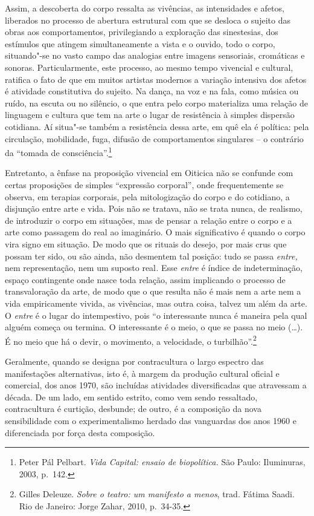 Assim, a descoberta do corpo ressalta as vivências, as intensidades e
afetos, liberados no processo de abertura estrutural com que se desloca
o sujeito das obras aos comportamentos, privilegiando a exploração das
sinestesias, dos estímulos que atingem simultaneamente a vista e o
ouvido, todo o corpo, situando"-se no vasto campo das analogias entre
imagens sensoriais, cromáticas e sonoras. Particularmente, este
processo, ao mesmo tempo vivencial e cultural, ratifica o fato de que em
muitos artistas modernos a variação intensiva dos afetos é atividade
constitutiva do sujeito. Na dança, na voz e na fala, como música ou
ruído, na escuta ou no silêncio, o que entra pelo corpo materializa uma
relação de linguagem e cultura que tem na arte o lugar de resistência à
simples dispersão cotidiana. Aí situa"-se também a resistência dessa
arte, em quê ela é política: pela circulação, mobilidade, fuga, difusão
de comportamentos singulares -- o contrário da ``tomada de
consciência''.\footnote{Peter Pál Pelbart. \emph{Vida Capital: ensaio de
  biopolítica.} São Paulo: Iluminuras, 2003, p.~142.}

Entretanto, a ênfase na proposição vivencial em Oiticica não se
confunde com certas proposições de simples ``expressão corporal'', onde
frequentemente se observa, em terapias corporais, pela mitologização do
corpo e do cotidiano, a disjunção entre arte e vida. Pois não se
tratava, não se trata nunca, de realismo, de introduzir o corpo em
situações, mas de pensar a relação entre o corpo e a arte como passagem
do real ao imaginário. O mais significativo é quando o corpo vira signo
em situação. De modo que os rituais do desejo, por mais crus que possam
ter sido, ou são ainda, não desmentem tal posição: tudo se passa
\emph{entre,} nem representação, nem um suposto real\emph{.} Esse
\emph{entre} é índice de indeterminação, espaço contingente onde nasce
toda relação, assim implicando o processo de transvaloração da arte, de
modo que o que resulta não é mais nem a arte nem a vida empiricamente
vivida, as vivências, mas outra coisa, talvez um além da arte. O
\emph{entre} é o lugar do intempestivo, pois ``o interessante nunca é
maneira pela qual alguém começa ou termina. O interessante é o meio, o
que se passa no meio (\ldots{}). É no meio que há o devir, o movimento, a
velocidade, o turbilhão''.\footnote{Gilles Deleuze. \emph{Sobre o
  teatro: um manifesto a menos}, trad. Fátima Saadi. Rio de Janeiro:
  Jorge Zahar, 2010, p.~34-35.}

\asterisc

Geralmente, quando se designa por contracultura o largo espectro das
manifestações alternativas, isto é, à margem da produção cultural
oficial e comercial, dos anos 1970, são incluídas atividades
diversificadas que atravessam a década. De um lado, em sentido estrito,
como vem sendo ressaltado, contracultura é curtição, desbunde; de outro,
é a composição da nova sensibilidade com o experimentalismo herdado das
vanguardas dos anos 1960 e diferenciada por força desta composição.

